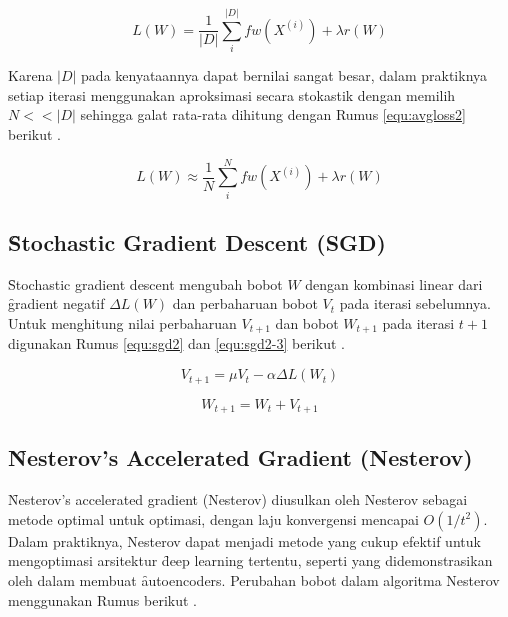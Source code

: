 \begin{equation}
\label{equ:avgloss}
L(W)=\frac{1}{|D|}\sum\limits_{i}^{|D|}fw(X^{(i)})+\lambda r(W)
\end{equation}

Karena $|D|$ pada kenyataannya dapat bernilai sangat besar, dalam praktiknya setiap iterasi menggunakan aproksimasi secara stokastik dengan memilih $N << |D|$ sehingga galat rata-rata dihitung dengan Rumus \ref{equ:avgloss2} berikut .

\begin{equation}
\label{equ:avgloss2}
L(W)\approx\frac{1}{N}\sum\limits_{i}^{N}fw(X^{(i)})+\lambda r(W)
\end{equation}
\subsection{\f{Stochastic Gradient Descent} (SGD)}
\f{Stochastic gradient descent} mengubah bobot $W$ dengan kombinasi linear dari \f{gradient} negatif $\Delta L(W)$ dan perbaharuan bobot $V_{t}$ pada iterasi sebelumnya. Untuk menghitung nilai perbaharuan $V_{t+1}$ dan bobot $W_{t+1}$ pada iterasi $t+1$ digunakan Rumus \ref{equ:sgd2} dan \ref{equ:sgd2-3} berikut .

\begin{equation}
\label{equ:sgd2}
V_{t+1} = \mu V_{t} - \alpha \Delta L(W_{t})
\end{equation}

\begin{equation}
\label{equ:sgd2-3}
W_{t+1} = W_{t} + V_{t+1}
\end{equation}
\subsection{\f{Nesterov's Accelerated Gradient} (Nesterov)}
\f{Nesterov's accelerated gradient} (Nesterov) diusulkan oleh Nesterov sebagai metode optimal untuk optimasi, dengan laju konvergensi mencapai $O(1/t^{2})$. Dalam praktiknya, Nesterov dapat menjadi metode yang cukup efektif untuk mengoptimasi arsitektur \f{deep learning} tertentu, seperti yang didemonstrasikan oleh  dalam membuat \f{autoencoders}. Perubahan bobot dalam algoritma Nesterov menggunakan Rumus berikut .

